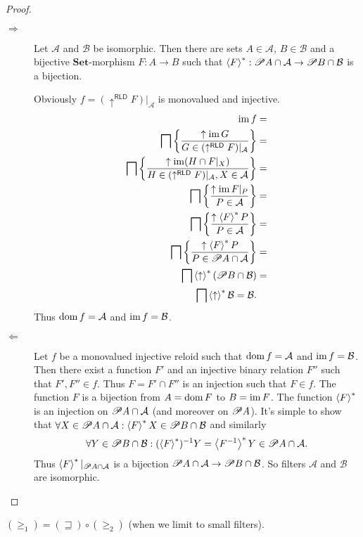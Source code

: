 \begin{proof}
~
\begin{description}
\item [{$\Rightarrow$}] Let $\mathcal{A}$ and $\mathcal{B}$ be isomorphic.
Then there are sets $A\in\mathcal{A}$, $B\in\mathcal{B}$ and a bijective
$\mathbf{Set}$-morphism $F:A\rightarrow B$ such that $\left\langle F\right\rangle ^{\ast}:\mathscr{P} A\cap\mathcal{A}\rightarrow\mathscr{P} B\cap\mathcal{B}$
is a bijection.


Obviously $f=(\uparrow^{\mathsf{RLD}}F)|_{\mathcal{A}}$ is monovalued
and injective.
\begin{align*}
\operatorname{im} f & =\\
\bigsqcap\left\{ \frac{\uparrow \operatorname{im} G}{G\in(\uparrow^{\mathsf{RLD}}F)|_{\mathcal{A}}}\right\} & =\\
\bigsqcap\left\{ \frac{\uparrow \operatorname{im}(H\cap F|_{X})}{H\in(\uparrow^{\mathsf{RLD}}F)|_{\mathcal{A}},X\in\mathcal{A}}\right\} & =\\
\bigsqcap\left\{ \frac{\uparrow \operatorname{im} F|_{P}}{P\in\mathcal{A}}\right\} & =\\
\bigsqcap\left\{ \frac{\uparrow \left\langle F\right\rangle ^{\ast}P}{P\in\mathcal{A}}\right\} & =\\
\bigsqcap\left\{ \frac{\uparrow \left\langle F\right\rangle ^{\ast}P}{P\in\mathscr{P} A\cap\mathcal{A}}\right\} & =\\
\bigsqcap\left\langle \uparrow \right\rangle ^{\ast}(\mathscr{P} B\cap\mathcal{B}) & =\\
\bigsqcap\left\langle \uparrow \right\rangle ^{\ast}\mathcal{B}=\mathcal{B}.
\end{align*}
Thus $\operatorname{dom} f=\mathcal{A}$ and $\operatorname{im} f=\mathcal{B}$.

\item [{$\Leftarrow$}] Let $f$ be a monovalued injective reloid such
that $\operatorname{dom} f=\mathcal{A}$ and $\operatorname{im} f=\mathcal{B}$. Then there exist
a function $F'$ and an injective binary relation $F''$ such that
$F',F''\in f$. Thus $F=F'\cap F''$ is an injection such that $F\in f$.
The function $F$ is a bijection from $A=\operatorname{dom} F$ to $B=\operatorname{im} F$. The
function $\left\langle F\right\rangle ^{\ast}$ is an injection on $\mathscr{P} A\cap\mathcal{A}$
(and moreover on $\mathscr{P} A$). It's simple to show that $\forall X\in\mathscr{P} A\cap\mathcal{A}:\left\langle F\right\rangle ^{\ast}X\in\mathscr{P} B\cap\mathcal{B}$
and similarly 
\[
\forall Y\in\mathscr{P} B\cap\mathcal{B}:(\left\langle F\right\rangle ^{\ast})^{-1}Y=\left\langle F^{-1}\right\rangle ^{\ast}Y\in\mathscr{P} A\cap\mathcal{A}.
\]
Thus $\left\langle F\right\rangle ^{\ast}|_{\mathscr{P} A\cap\mathcal{A}}$ is a bijection $\mathscr{P} A\cap\mathcal{A}\rightarrow\mathscr{P} B\cap\mathcal{B}$.
So filters $\mathcal{A}$ and $\mathcal{B}$ are isomorphic.
\end{description}
\end{proof}
\begin{prop}
$(\ge_{1})=(\sqsupseteq)\circ(\ge_{2})$ (when we limit to small filters).\end{prop}
